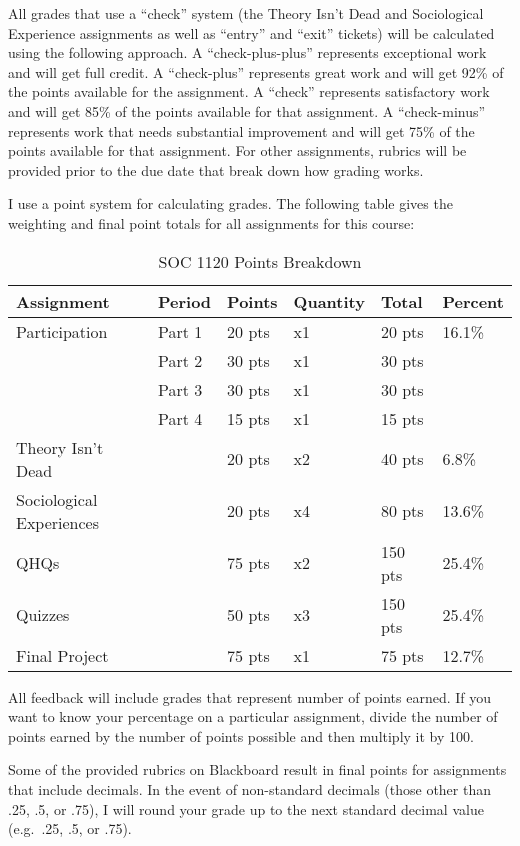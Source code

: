 \documentclass[
]{book}
\begin{document}
All grades that use a ``check'' system (the Theory Isn't Dead and Sociological Experience assignments as well as ``entry'' and ``exit'' tickets) will be calculated using the following approach. A ``check-plus-plus'' represents exceptional work and will get full credit. A ``check-plus'' represents great work and will get 92\% of the points available for the assignment. A ``check'' represents satisfactory work and will get 85\% of the points available for that assignment. A ``check-minus'' represents work that needs substantial improvement and will get 75\% of the points available for that assignment. For other assignments, rubrics will be provided prior to the due date that break down how grading works.

I use a point system for calculating grades. The following table gives the weighting and final point totals for all assignments for this course:

\begin{table}

\caption{\label{tab:unnamed-chunk-11}SOC 1120 Points Breakdown}
\centering
\begin{tabular}[t]{llllll}
\toprule
Assignment & Period & Points & Quantity & Total & Percent\\
\midrule
Participation & Part 1 & 20 pts & x1 & 20 pts & 16.1\%\\
 & Part 2 & 30 pts & x1 & 30 pts & \\
 & Part 3 & 30 pts & x1 & 30 pts & \\
 & Part 4 & 15 pts & x1 & 15 pts & \\
Theory Isn't Dead &  & 20 pts & x2 & 40 pts & 6.8\%\\
\addlinespace
Sociological Experiences &  & 20 pts & x4 & 80 pts & 13.6\%\\
QHQs &  & 75 pts & x2 & 150 pts & 25.4\%\\
Quizzes &  & 50 pts & x3 & 150 pts & 25.4\%\\
Final Project &  & 75 pts & x1 & 75 pts & 12.7\%\\
\bottomrule
\end{tabular}
\end{table}

All feedback will include grades that represent number of points earned. If you want to know your percentage on a particular assignment, divide the number of points earned by the number of points possible and then multiply it by 100.

Some of the provided rubrics on Blackboard result in final points for assignments that include decimals. In the event of non-standard decimals (those other than .25, .5, or .75), I will round your grade up to the next standard decimal value (e.g.~.25, .5, or .75).
\end{document}
